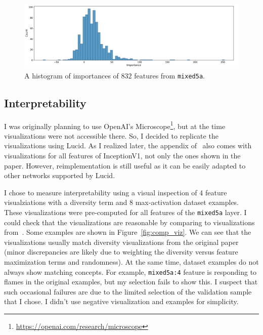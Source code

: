 \documentclass[12pt]{article}
\begin{document}
\begin{figure}[t]
    \centering
    \includegraphics[width=\linewidth]{fig/abs_importance.pdf}
    \caption{A histogram of importances of $832$ features from \texttt{mixed5a}.}
    \label{fig:importance_distr}
\end{figure}

\subsection{Interpretability}
I was originally planning to use OpenAI's Microscope\footnote{\url{https://openai.com/research/microscope}}, but at the time visualizations were not accessible there. So, I decided to replicate the visualizations using Lucid. As I realized later, the appendix of~\cite{olah2017feature} also comes with visualizations for all features of InceptionV1, not only the ones shown in the paper. However, reimplementation is still useful as it can be easily adapted to other networks supported by Lucid.

I chose to measure interpretability using a visual inspection of 4 feature visualziations with a diversity term and 8 max-activation dataset examples. These visualizations were pre-computed for all features of the \texttt{mixed5a} layer. I could check that the visualizations are reasonable by comparing to visualizations from~\cite{olah2017feature}. Some examples are shown in Figure~\ref{fig:comp_viz}. We can see that the visualizations usually match diversity visualizations from the original paper (minor discrepancies are likely due to weighting the diversity versus feature maximization terms and randomness). At the same time, dataset examples do not always show matching concepts. For example, \texttt{mixed5a:4} feature is responding to flames in the original examples, but my selection fails to show this. I suspect that such occasional failures are due to the limited selection of the validation sample that I chose. I didn't use negative visualization and examples for simplicity.
\end{document}
